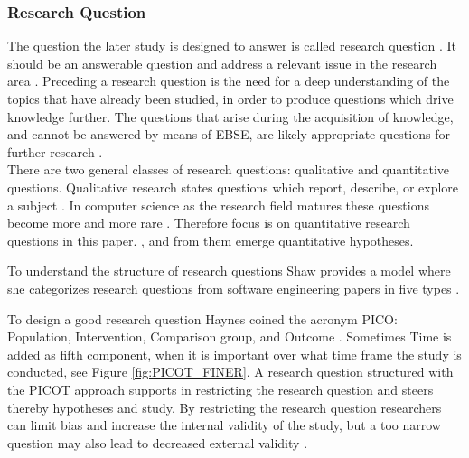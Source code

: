 
\subsubsection{Research Question}

The question the later study is designed to answer is called research question \cite{Vickers}. It should be an answerable question and address a relevant issue in the research area \cite{Dyba2005}. Preceding a research question is the need for a deep understanding of the topics that have already been studied, in order to produce questions which drive knowledge further. The questions that arise during the acquisition of knowledge, and cannot be answered by means of EBSE, are likely appropriate questions for further research \cite{Farrugia2009}. \\
There are two general classes of research questions: qualitative and quantitative questions. Qualitative research states questions which report, describe, or explore a subject \cite[p. 139-141]{Creswell2014}. In computer science as the research field matures these questions become more and more rare . Therefore focus is on quantitative research questions in this paper.  \cite[p. 143]{Creswell2014}, and from them emerge quantitative hypotheses.

To understand the structure of research questions Shaw provides a model where she categorizes research questions from software engineering papers in five types \cite{Shaw2002} . 

To design a good research question Haynes coined the acronym PICO: Population, Intervention, Comparison group, and Outcome \cite{BrianHaynes2006}. Sometimes Time is added as fifth component, when it is important over what time frame the study is conducted, see Figure \ref{fig:PICOT_FINER}. A research question structured with the PICOT approach supports in restricting the research question and steers thereby hypotheses and study. By restricting the research question researchers can limit bias and increase the internal validity of the study, but a too narrow question may also lead to decreased external validity \cite{Farrugia2009}. 

